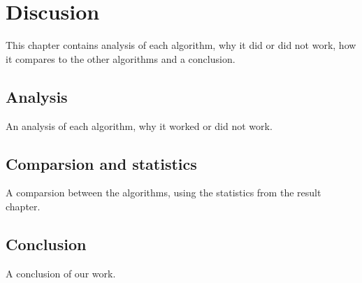 \chapter{Discusion}
This chapter contains analysis of each algorithm, why it did or did not work, how it compares to the other algorithms and a conclusion.
\section{Analysis}
An analysis of each algorithm, why it worked or did not work. \par

\section{Comparsion and statistics}
A comparsion between the algorithms, using the statistics from the result chapter. \par

\section{Conclusion}
A conclusion of our work.

